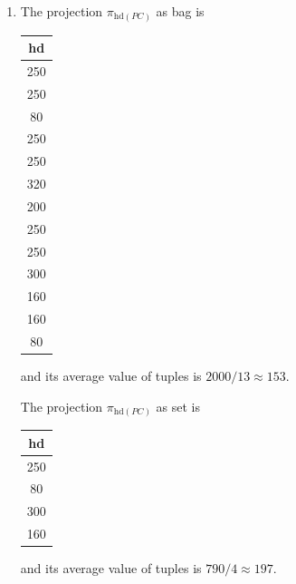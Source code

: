 \documentclass[12pt]{article}
\begin{document}
\begin{enumerate}
    \item

    The projection $\pi_{\text{hd}(PC)}$ as bag is

    \bigskip

    \begin{tabular}{|c|}
        \hline
        hd\\
        \hline
        250\\
        \hline
        250\\
        \hline
        80\\
        \hline
        250\\
        \hline
        250\\
        \hline
        320\\
        \hline
        200\\
        \hline
        250\\
        \hline
        250\\
        \hline
        300\\
        \hline
        160\\
        \hline
        160\\
        \hline
        80\\
        \hline
    \end{tabular}

    \bigskip

    and its average value of tuples is $2000/13 \approx 153$.

    \bigskip

    The projection $\pi_{\text{hd}(PC)}$ as set is

    \bigskip

    \begin{tabular}{|c|}
        \hline
        hd\\
        \hline
        250\\
        \hline
        80\\
        \hline
        300\\
        \hline
        160\\
        \hline
    \end{tabular}

    \bigskip

    and its average value of tuples is $790/4 \approx 197$.

\end{enumerate}
\end{document}
